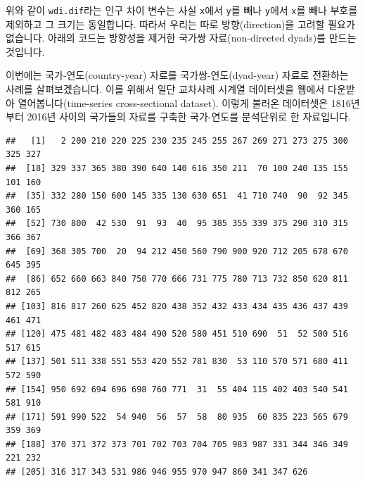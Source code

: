\documentclass[]{book}
\newenvironment{Shaded}{\begin{snugshade}}{\end{snugshade}}
\newcommand{\CommentTok}[1]{\textcolor[rgb]{0.56,0.35,0.01}{\textit{#1}}}
\newcommand{\DataTypeTok}[1]{\textcolor[rgb]{0.13,0.29,0.53}{#1}}
\newcommand{\KeywordTok}[1]{\textcolor[rgb]{0.13,0.29,0.53}{\textbf{#1}}}
\newcommand{\NormalTok}[1]{#1}
\newcommand{\OperatorTok}[1]{\textcolor[rgb]{0.81,0.36,0.00}{\textbf{#1}}}
\newcommand{\OtherTok}[1]{\textcolor[rgb]{0.56,0.35,0.01}{#1}}
\newcommand{\StringTok}[1]{\textcolor[rgb]{0.31,0.60,0.02}{#1}}
\begin{document}
위와 같이 \texttt{wdi.dif}라는 인구 차이 변수는 사실 \texttt{x}에서 \texttt{y}를 빼나 \texttt{y}에서 \texttt{x}를 빼나 부호를 제외하고 그 크기는 동일합니다. 따라서 우리는 따로 방향(direction)을 고려할 필요가 없습니다. 아래의 코드는 방향성을 제거한 국가쌍 자료(non-directed dyads)를 만드는 것입니다.

\begin{Shaded}
\end{Shaded}

이번에는 국가-연도(country-year) 자료를 국가쌍-연도(dyad-year) 자료로 전환하는 사례를 살펴보겠습니다. 이를 위해서 일단 교차사례 시계열 데이터셋을 웹에서 다운받아 열어봅니다(time-series cross-sectional dataset). 이렇게 불러온 데이터셋은 1816년부터 2016년 사이의 국가들의 자료를 구축한 국가-연도를 분석단위로 한 자료입니다.

\begin{Shaded}
\end{Shaded}

\begin{verbatim}
##   [1]   2 200 210 220 225 230 235 245 255 267 269 271 273 275 300 325 327
##  [18] 329 337 365 380 390 640 140 616 350 211  70 100 240 135 155 101 160
##  [35] 332 280 150 600 145 335 130 630 651  41 710 740  90  92 345 360 165
##  [52] 730 800  42 530  91  93  40  95 385 355 339 375 290 310 315 366 367
##  [69] 368 305 700  20  94 212 450 560 790 900 920 712 205 678 670 645 395
##  [86] 652 660 663 840 750 770 666 731 775 780 713 732 850 620 811 812 265
## [103] 816 817 260 625 452 820 438 352 432 433 434 435 436 437 439 461 471
## [120] 475 481 482 483 484 490 520 580 451 510 690  51  52 500 516 517 615
## [137] 501 511 338 551 553 420 552 781 830  53 110 570 571 680 411 572 590
## [154] 950 692 694 696 698 760 771  31  55 404 115 402 403 540 541 581 910
## [171] 591 990 522  54 940  56  57  58  80 935  60 835 223 565 679 359 369
## [188] 370 371 372 373 701 702 703 704 705 983 987 331 344 346 349 221 232
## [205] 316 317 343 531 986 946 955 970 947 860 341 347 626
\end{verbatim}
\end{document}
